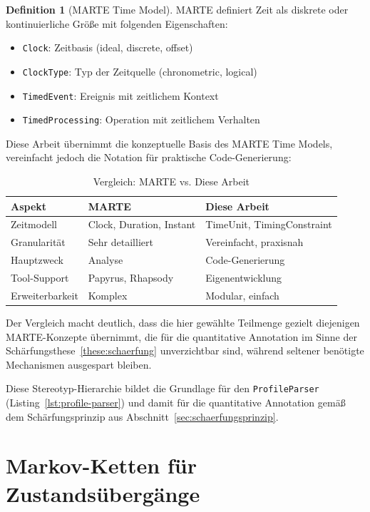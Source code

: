 ﻿\documentclass[a4paper,12pt]{report}
\theoremstyle{definition}
\newtheorem{definition}{Definition}[section]
\begin{document}
\begin{definition}[MARTE Time Model]
	MARTE definiert Zeit als diskrete oder kontinuierliche Größe mit folgenden Eigenschaften:
	\begin{itemize}
		\item[-] \texttt{Clock}: Zeitbasis (ideal, discrete, offset)
		\item[-] \texttt{ClockType}: Typ der Zeitquelle (chronometric, logical)
		\item[-] \texttt{TimedEvent}: Ereignis mit zeitlichem Kontext
		\item[-] \texttt{TimedProcessing}: Operation mit zeitlichem Verhalten
	\end{itemize}
\end{definition}

Diese Arbeit übernimmt die konzeptuelle Basis des MARTE Time Models, vereinfacht jedoch die Notation für praktische Code-Generierung:

\begin{table}[H]
	\centering
	\begin{tabular}{@{}lll@{}}
		\toprule
		\textbf{Aspekt} & \textbf{MARTE} & \textbf{Diese Arbeit} \\
		\midrule
		Zeitmodell & Clock, Duration, Instant & TimeUnit, TimingConstraint \\
		Granularität & Sehr detailliert & Vereinfacht, praxisnah \\
		Hauptzweck & Analyse & Code-Generierung \\
		Tool-Support & Papyrus, Rhapsody & Eigenentwicklung \\
		Erweiterbarkeit & Komplex & Modular, einfach \\
		\bottomrule
	\end{tabular}
	\caption{Vergleich: MARTE vs. Diese Arbeit}
	\label{tab:marte-comparison}
\end{table}

Der Vergleich macht deutlich, dass die hier gewählte Teilmenge gezielt diejenigen MARTE-Konzepte übernimmt, die für die quantitative Annotation im Sinne der Schärfungsthese~\ref{these:schaerfung} unverzichtbar sind, während seltener benötigte Mechanismen ausgespart bleiben.

Diese Stereotyp-Hierarchie bildet die Grundlage für den \texttt{ProfileParser} (Listing~\ref{lst:profile-parser}) und damit für die quantitative Annotation gemäß dem Schärfungsprinzip aus Abschnitt~\ref{sec:schaerfungsprinzip}.

\section{Markov-Ketten für Zustandsübergänge}
\label{sec:markov-grundlagen}
\end{document}
